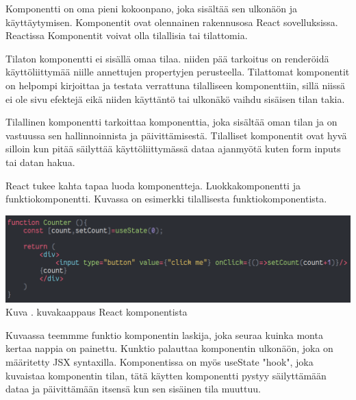 



Komponentti on oma pieni kokoonpano, joka sisältää sen ulkonäön ja käyttäytymisen.
Komponentit ovat olennainen rakennusosa React sovelluksissa. Reactissa Komponentit voivat olla tilallisia tai tilattomia. 
\medskip

%
Tilaton komponentti ei sisällä omaa tilaa. 
niiden pää tarkoitus on renderöidä käyttöliittymää niille annettujen propertyjen perusteella.
Tilattomat komponentit on helpompi kirjoittaa ja testata verrattuna tilalliseen komponenttiin, 
sillä niissä ei ole sivu efektejä eikä niiden käyttäntö tai ulkonäkö vaihdu sisäisen tilan takia.
\medskip


Tilallinen komponentti tarkoittaa komponenttia, joka sisältää oman tilan ja on vastuussa sen hallinnoinnista ja päivittämisestä.
Tilalliset komponentit ovat hyvä silloin kun pitää säilyttää käyttöliittymässä dataa ajanmyötä kuten form inputs tai datan hakua.\\
\medskip


React tukee kahta tapaa luoda komponentteja. Luokkakomponentti ja funktiokomponentti.\citemissing
Kuvassa \nextImageCount {} on esimerkki tilallisesta funktiokomponentista.
\medskip


\bigskip
\includegraphics[width=15cm]{src/public/oppar/function_component.png}\\
Kuva \getImgCount{}. kuvakaappaus React komponentista
\medskip

Kuvaassa teemmme funktio komponentin laskija, joka seuraa kuinka monta kertaa nappia on painettu.
Kunktio palauttaa komponentin ulkonäön, joka on määritetty JSX syntaxilla.
Komponentissa on myös useState "hook"{}, joka kuvaistaa komponentin tilan, tätä käytten komponentti pystyy säilyttämään dataa ja päivittämään itsensä kun sen sisäinen tila muuttuu.
\medskip

